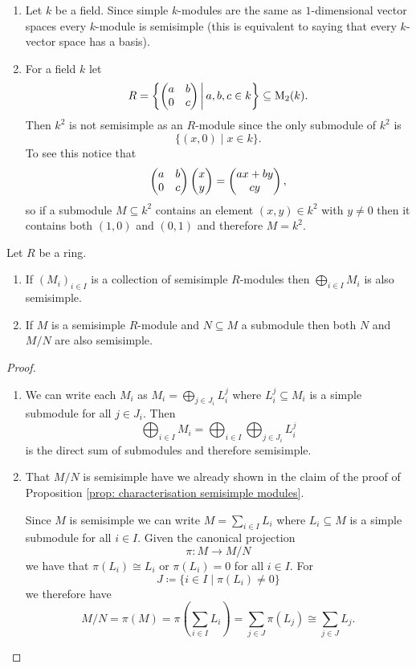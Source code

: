 \begin{expls}
 \begin{enumerate}[label=\emph{\alph*})]
  \item
  Let $k$ be a field. Since simple $k$-modules are the same as $1$-dimensional vector spaces every $k$-module is semisimple (this is equivalent to saying that every $k$-vector space has a basis).
  \item
  For a field $k$ let
  \[
   R = \left\{ \begin{pmatrix}a & b \\ 0 & c\end{pmatrix} \,\middle|\, a, b, c \in k \right\} \subseteq \operatorname{M}_2(k).
  \]
  Then $k^2$ is not semisimple as an $R$-module since the only submodule of $k^2$ is
  \[
   \{ (x,0) \mid x \in k \}.
  \]
  To see this notice that
  \[
   \begin{pmatrix}a & b \\ 0 & c\end{pmatrix} \begin{pmatrix}x \\ y\end{pmatrix} = \begin{pmatrix}ax + by \\ cy\end{pmatrix},
  \]
  so if a submodule $M \subseteq k^2$ contains an element $(x,y) \in k^2$ with $y \neq 0$ then it contains both $(1,0)$ and $(0,1)$ and therefore $M = k^2$.
 \end{enumerate}
\end{expls}


\begin{lem}\label{lem: inherit semisimple}
 Let $R$ be a ring.
 \begin{enumerate}[label=\emph{\alph*})]
  \item
  If $(M_i)_{i \in I}$ is a collection of semisimple $R$-modules then $\bigoplus_{i \in I} M_i$ is also semisimple.
  \item
  If $M$ is a semisimple $R$-module and $N \subseteq M$ a submodule then both $N$ and $M/N$ are also semisimple.
 \end{enumerate}
\end{lem}
\begin{proof}
 \begin{enumerate}[label=\emph{\alph*})]
  \item
  We can write each $M_i$ as $M_i = \bigoplus_{j \in J_i} L^j_i$ where $L^j_i \subseteq M_i$ is a simple submodule for all $j \in J_i$. Then
  \[
   \bigoplus_{i \in I} M_i = \bigoplus_{i \in I} \bigoplus_{j \in J_i} L^j_i
  \]
  is the direct sum of submodules and therefore semisimple.
  \item
  That $M/N$ is semisimple have we already shown in the claim of the proof of Proposition \ref{prop: characterisation semisimple modules}.
  
  Since $M$ is semisimple we can write $M = \sum_{i \in I} L_i$ where $L_i \subseteq M$ is a simple submodule for all $i \in I$. Given the canonical projection
  \[
   \pi \colon M \to M/N
  \]
  we have that $\pi(L_i) \cong L_i$ or $\pi(L_i) = 0$ for all $i \in I$. For
  \[
   J \coloneqq \{i \in I \mid \pi(L_i) \neq 0\}
  \]
  we therefore have
  \[
   M/N = \pi(M) = \pi\left( \sum_{i \in I} L_i \right) = \sum_{j \in J} \pi(L_j) \cong \sum_{j \in J} L_j.
  \]
 \end{enumerate}
\end{proof}


